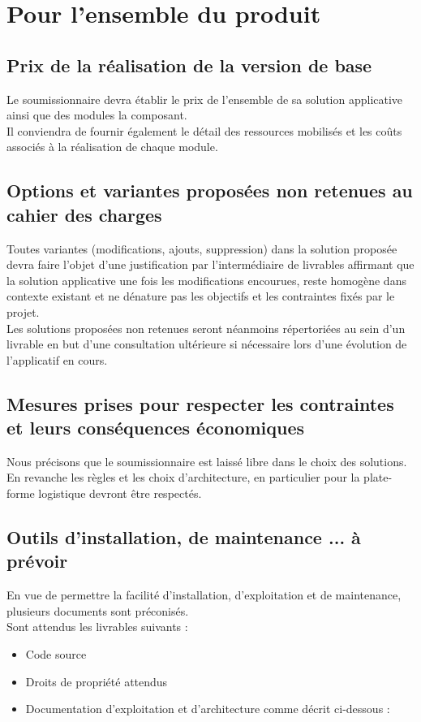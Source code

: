 \section{Pour l'ensemble du produit}

\subsection{Prix de la réalisation de la version de base}
Le soumissionnaire devra établir le prix de l'ensemble de sa solution applicative ainsi que des modules la composant.
\\
Il conviendra de fournir également le détail des ressources mobilisés et les coûts associés à la réalisation de chaque module. 

\subsection{Options et variantes proposées non retenues au cahier des charges}
Toutes variantes (modifications, ajouts, suppression) dans la solution proposée devra faire l'objet d'une justification par l'intermédiaire de livrables affirmant que la solution applicative une fois les modifications encourues, reste homogène dans contexte existant et ne dénature pas les objectifs et les contraintes fixés par le projet.
\\
Les solutions proposées non retenues seront néanmoins répertoriées au sein d'un livrable en but d'une consultation ultérieure si nécessaire lors d'une évolution de l'applicatif en cours.

\subsection{Mesures prises pour respecter les contraintes et leurs conséquences économiques}
Nous précisons que le soumissionnaire est laissé libre dans le choix des solutions. En revanche les règles et les choix d'architecture, en particulier pour la plate-forme logistique devront être respectés.

\subsection{Outils d'installation, de maintenance ... à prévoir}
En vue de permettre la facilité d'installation, d'exploitation et de maintenance, plusieurs documents sont préconisés.
\\
Sont attendus les livrables suivants :
\begin{itemize}
 \item Code source
 \item Droits de propriété attendus
 \item Documentation d'exploitation et d'architecture comme décrit ci-dessous :
\end{itemize}

